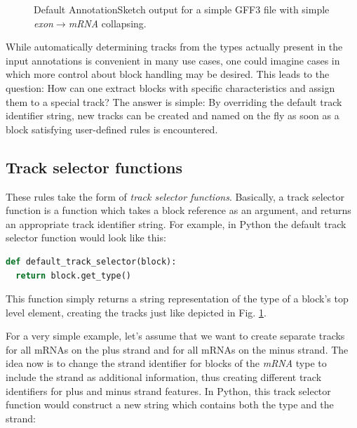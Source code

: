 \documentclass[a4paper]{scrreprt}
\begin{document}
\begin{figure}[ht]
\caption{Default AnnotationSketch output for a simple GFF3 file with simple \emph{exon}$\to$\emph{mRNA} collapsing.}
\label{tsexample1}
\end{figure}

While automatically determining tracks from the types actually present in the input annotations is convenient in many use cases, one could imagine cases in which more control about block handling may be desired. This leads to the question: How can one extract blocks with specific characteristics and assign them to a special track? The answer is simple: By overriding the default track identifier string, new tracks can be created and named on the fly as soon as a block satisfying user-defined rules is encountered.

\subsection{Track selector functions}

These rules take the form of \emph{track selector functions}. Basically, a track selector function is a function which takes a block reference as an argument, and returns an appropriate track identifier string. For example, in Python the default track selector function would look like this:
\begin{lstlisting}[language=Python, showstringspaces=false,numbers=none,frame=single]
def default_track_selector(block):
  return block.get_type()
\end{lstlisting}

This function simply returns a string representation of the type of a block's top level element, creating the tracks just like depicted in Fig. \ref{tsexample1}.

For a very simple example, let's assume that we want to create separate tracks for all mRNAs on the plus strand and for all mRNAs on the minus strand. The idea now is to change the strand identifier for blocks of the \emph{mRNA} type to include the strand as additional information, thus creating different track identifiers for plus and minus strand features. In Python, this track selector function would construct a new string which contains both the type and the strand:
\end{document}
